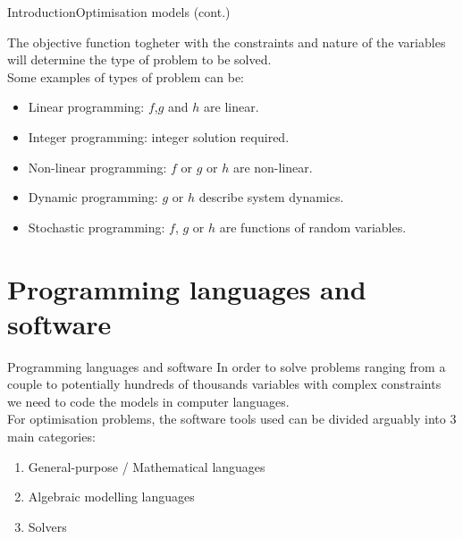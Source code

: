\documentclass[handout]{beamer}
\begin{document}
\begin{frame}[t]{Introduction}{Optimisation models (cont.)}

The objective function togheter with the constraints and nature of the variables will determine the type of problem to be solved.\\[12pt]

Some examples of types of problem can be:\\[12pt]
\begin{itemize}
\item Linear programming: $f$,$g$ and $h$ are linear.
\item Integer programming: integer solution required.
\item Non-linear programming: $f$ or $g$ or $h$ are non-linear.
\item Dynamic programming: $g$ or $h$ describe system dynamics.
\item Stochastic programming: $f$, $g$ or $h$ are functions of random variables.
\end{itemize}

\end{frame}

\section{Programming languages and software}

\begin{frame}[t]{Programming languages and software}
  In order to solve problems ranging from a couple to potentially hundreds of thousands variables with complex constraints we need to code the models in computer languages.\\[12pt]

  For optimisation problems, the software tools used can be divided arguably into 3 main categories:

  \begin{enumerate}
    \item General-purpose / Mathematical languages
    \item Algebraic modelling languages
    \item Solvers
  \end{enumerate}

\end{frame}
\end{document}
